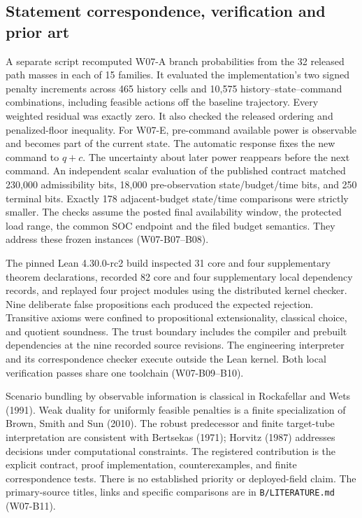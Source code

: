 \documentclass[11pt,letterpaper]{article}
\begin{document}
\subsection{Statement correspondence, verification and prior art}
A separate script recomputed W07-A branch probabilities from the 32 released path masses in each of 15 families. It evaluated the implementation's two signed penalty increments across 465 history cells and 10,575 history--state--command combinations, including feasible actions off the baseline trajectory. Every weighted residual was exactly zero. It also checked the released ordering and penalized-floor inequality. For W07-E, pre-command available power is observable and becomes part of the current state. The automatic response fixes the new command to $q+c$. The uncertainty about later power reappears before the next command. An independent scalar evaluation of the published contract matched 230,000 admissibility bits, 18,000 pre-observation state/budget/time bits, and 250 terminal bits. Exactly 178 adjacent-budget state/time comparisons were strictly smaller. The checks assume the posted final availability window, the protected load range, the common SOC endpoint and the filed budget semantics. They address these frozen instances (W07-B07--B08).

The pinned Lean 4.30.0-rc2 build inspected 31 core and four supplementary theorem declarations, recorded 82 core and four supplementary local dependency records, and replayed four project modules using the distributed kernel checker. Nine deliberate false propositions each produced the expected rejection. Transitive axioms were confined to propositional extensionality, classical choice, and quotient soundness. The trust boundary includes the compiler and prebuilt dependencies at the nine recorded source revisions. The engineering interpreter and its correspondence checker execute outside the Lean kernel. Both local verification passes share one toolchain (W07-B09--B10).

Scenario bundling by observable information is classical in Rockafellar and Wets (1991). Weak duality for uniformly feasible penalties is a finite specialization of Brown, Smith and Sun (2010). The robust predecessor and finite target-tube interpretation are consistent with Bertsekas (1971); Horvitz (1987) addresses decisions under computational constraints. The registered contribution is the explicit contract, proof implementation, counterexamples, and finite correspondence tests. There is no established priority or deployed-field claim. The primary-source titles, links and specific comparisons are in \texttt{B/LITERATURE.md} (W07-B11).
\end{document}
